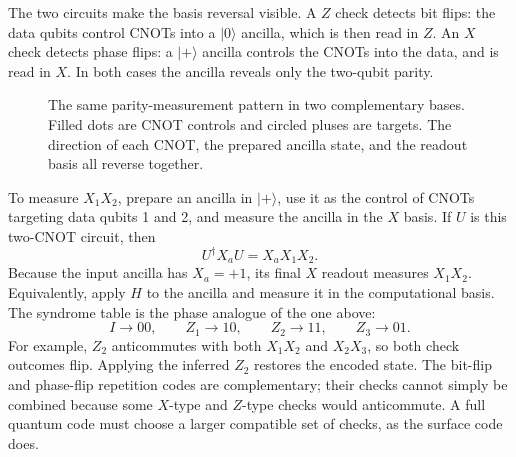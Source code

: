\documentclass[11pt,a4paper]{article}
\newcommand{\ket}[1]{\lvert #1\rangle}
\newcommand{\ctrl}[2]{\fill[ink] (#1,#2) circle (2pt);}
\newcommand{\targ}[2]{\draw[ink,fill=white] (#1,#2) circle (0.12);\draw[ink] (#1-0.12,#2)--(#1+0.12,#2);\draw[ink] (#1,#2-0.12)--(#1,#2+0.12);}
\begin{document}
The two circuits make the basis reversal visible. A $Z$ check detects
bit flips: the data qubits control CNOTs into a $\ket0$ ancilla, which
is then read in $Z$. An $X$ check detects phase flips: a $\ket+$ ancilla
controls the CNOTs into the data, and is read in $X$. In both cases the
ancilla reveals only the two-qubit parity.

\begin{figure}[!ht]
\centering
{}
\caption{The same parity-measurement pattern in two complementary bases. Filled dots are CNOT controls and circled pluses are targets. The direction of each CNOT, the prepared ancilla state, and the readout basis all reverse together.}
\label{fig:check-bases}
\end{figure}

To measure $X_1X_2$, prepare an ancilla in $\ket{+}$, use it as the
control of CNOTs targeting data qubits 1 and 2, and measure the ancilla
in the $X$ basis. If $U$ is this two-CNOT circuit, then
\[
U^\dagger X_aU=X_aX_1X_2.
\]
Because the input ancilla has $X_a=+1$, its final $X$ readout measures
$X_1X_2$. Equivalently, apply $H$ to the ancilla and measure it in the
computational basis. The syndrome table is the phase analogue of the
one above:
\[
I\longrightarrow00,\qquad Z_1\longrightarrow10,\qquad
Z_2\longrightarrow11,\qquad Z_3\longrightarrow01.
\]
For example, $Z_2$ anticommutes with both $X_1X_2$ and $X_2X_3$, so both
check outcomes flip. Applying the inferred $Z_2$ restores the encoded
state. The bit-flip and phase-flip repetition codes are complementary;
their checks cannot simply be combined because some $X$-type and
$Z$-type checks would anticommute. A full quantum code must choose a
larger compatible set of checks, as the surface code does.
\end{document}
